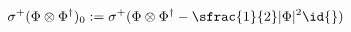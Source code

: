 \begin{equation}
 \sigma^+(\Phi\otimes\Phi^\dagger)_0:=
 \sigma^+(\Phi\otimes\Phi^\dagger-\sfrac{1}{2}|\Phi|^2\id{})
\end{equation}

